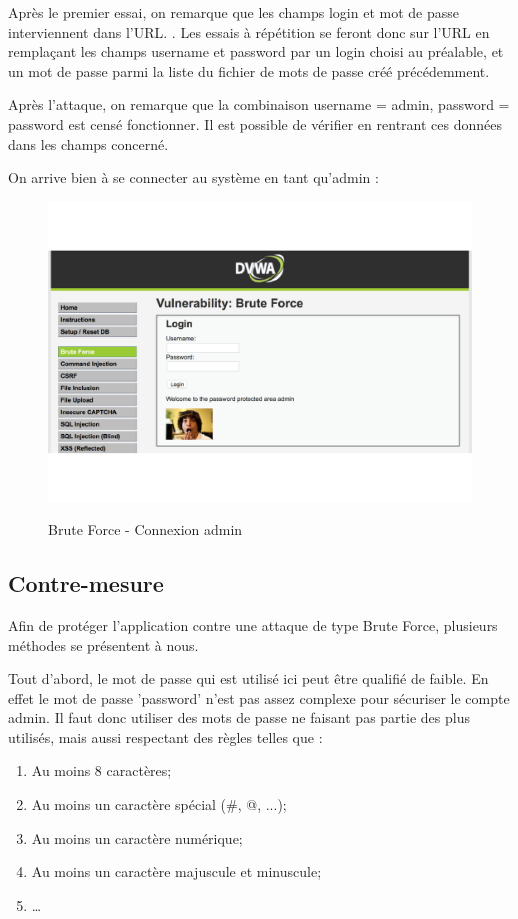 Après le premier essai, on remarque que les champs login et mot de passe interviennent dans l’URL. . Les essais à répétition se feront donc sur l’URL en remplaçant les champs username et password par un login choisi au préalable, et un mot de passe parmi la liste du fichier de mots de passe créé précédemment.

Après l’attaque, on remarque que la combinaison username = admin, password = password est censé fonctionner. Il est possible de vérifier en rentrant ces données dans les champs concerné.


On arrive bien à se connecter au système en tant qu’admin :

\begin{figure}[!h]
\begin{center}

\label{inclusion}
\includegraphics[scale=1.2]{images/BruteForce-ConnexionAdmin.pdf}

\caption{Brute Force - Connexion admin}

\end{center}
\end{figure}

\subsection{Contre-mesure}

Afin de protéger l’application contre une attaque de type Brute Force, plusieurs méthodes se présentent à nous.

Tout d’abord, le mot de passe qui est utilisé ici peut être qualifié de faible. En effet le mot de passe 'password' n’est pas assez complexe pour sécuriser le compte admin. Il faut donc utiliser des mots de passe ne faisant pas partie des plus utilisés, mais aussi respectant des règles telles que :
\begin{enumerate}
\item Au moins 8 caractères;
\item Au moins un caractère spécial (\#, @, ...);
\item Au moins un caractère numérique;
\item Au moins un caractère majuscule et minuscule;
\item …
\end{enumerate}

